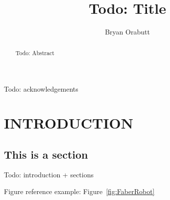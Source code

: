 \documentclass[12pt,oneside,final]{siuethesis}
\author{Bryan Orabutt}
\title{Todo: Title}
\theoremstyle{definition}
\begin{document}
\maketitle 

\frontmatter %

\copyrightpage %

\begin{abstract}

Todo: Abstract

\end{abstract}

\begin{acknowledgements}


Todo: acknowledgements

\end{acknowledgements}

\tableofcontents

\cleardoublepage %

\listoffigures %

\cleardoublepage

\listoftables

\mainmatter %


\chapter{INTRODUCTION}  %


\section{This is a section}

Todo: introduction + sections

Figure reference example: Figure~\ref{fig:FaberRobot}
\end{document}
